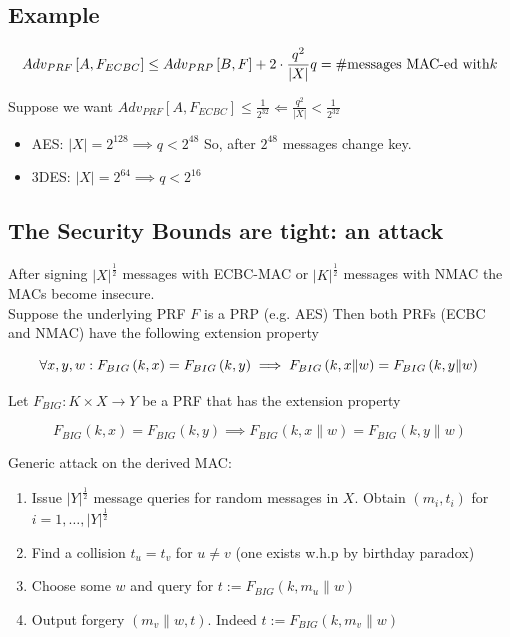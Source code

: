 \documentclass[a4paper]{article}
\begin{document}
	\subsection{Example}
	\begin{center}
		\[
		Adv_{PRF}\left[ A, F_{ECBC} \right] \le Adv_{PRP}\left[ B, F \right] + 2 \cdot \frac{q^2}{|X|}\\
		q = \# \text{messages MAC-ed with} k
		\] 
	\end{center}
	Suppose we want $Adv_{PRF}\left[ A,F_{ECBC} \right] \le \frac{1}{2^{32}} \Leftarrow \frac{q^2}{|X|}<\frac{1}{2^{32}}$
	\begin{itemize}
		\item AES: $|X| = 2^{128} \implies q<2^{48}$ So, after $2^{48}$ messages change key.
		\item 3DES: $|X| = 2^{64} \implies q<2^{16}$
	\end{itemize}
	\subsection{The Security Bounds are tight: an attack}
	After signing $|X|^{\frac{1}{2}}$ messages with ECBC-MAC or $|K|^{\frac{1}{2}}$ messages with NMAC
	the MACs become insecure.\\
	Suppose the underlying PRF $F$ is a PRP (e.g. AES)
	Then both PRFs (ECBC and NMAC) have the following extension property
			\begin{center}
				\[\forall x,y,w: F_{BIG}\left( k,x \right) = F_{BIG}\left( k,y \right)
					\implies
					F_{BIG}\left( k, x \| w \right) = F_{BIG}\left( k,y \| w \right) \\
				\] 
			\end{center}
	Let $F_{BIG}: K \times X \to Y$ be a PRF that has the extension property
	\begin{center}
		\[
			F_{BIG}\left( k,x \right) = F_{BIG}\left( k,y \right)
			\implies
			F_{BIG}\left( k,x\| w \right)  = F_{BIG}\left( k,y\|w \right)
		\] 
	\end{center}
	Generic attack on the derived MAC:
	\begin{enumerate}
		\item Issue $|Y|^{\frac{1}{2}}$ message queries for random messages in $X$. Obtain
			$\left( m_i,t_i \right) $ for $i = 1,\ldots, |Y|^{\frac{1}{2}}$ 
		\item Find a collision $t_u = t_v$ for $u\neq v$ (one exists w.h.p by birthday paradox)
		\item Choose some $w$ and query for $t:=F_{BIG}\left( k,m_u \| w \right) $ 
		\item Output forgery $\left( m_v\|w,t \right) $. Indeed $t:=F_{BIG}\left( k,m_v\|w \right) $
	\end{enumerate}
\end{document}
